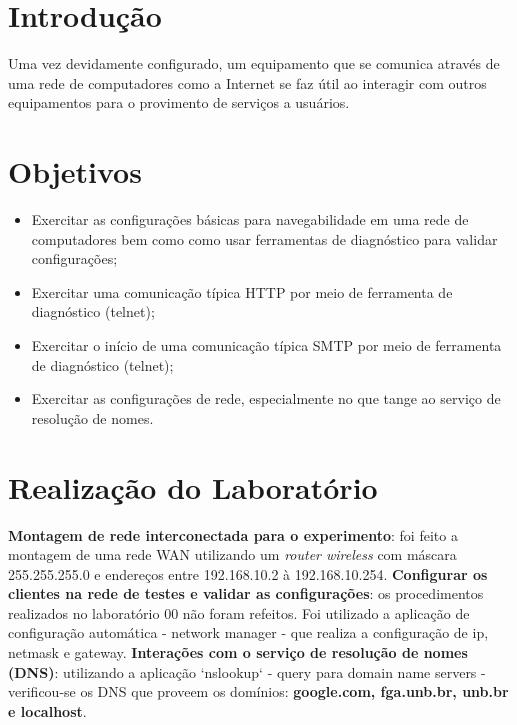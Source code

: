 \section{Introdução}

Uma vez devidamente configurado, um equipamento que se comunica através de uma rede de
computadores como a Internet se faz útil ao interagir com outros equipamentos para o provimento
de serviços a usuários.

\section{Objetivos}

\begin{itemize}
  \item Exercitar as configurações básicas para navegabilidade em uma rede de computadores bem como
    como usar ferramentas de diagnóstico para validar configurações;
  \item Exercitar uma comunicação típica HTTP por meio de ferramenta de diagnóstico (telnet);
  \item Exercitar o início de uma comunicação típica SMTP por meio de ferramenta de diagnóstico
    (telnet);
  \item Exercitar as configurações de rede, especialmente no que tange ao serviço de resolução de
    nomes.
\end{itemize}

\section{Realização do Laboratório}
\textbf{Montagem de rede interconectada para o experimento}: foi feito a montagem de uma rede WAN utilizando
um \textit{router wireless} com máscara 255.255.255.0 e endereços entre 192.168.10.2 à 192.168.10.254.
\bigbreak
\textbf{Configurar os clientes na rede de testes e validar as configurações}: os procedimentos realizados no
laboratório 00 não foram refeitos. Foi utilizado a aplicação de configuração automática - network manager -
que realiza a configuração de ip, netmask e gateway.
\bigbreak
\textbf{Interações com o serviço de resolução de nomes (DNS)}: utilizando a aplicação `nslookup` - query para
domain name servers - verificou-se os DNS que proveem os domínios: \textbf{google.com, fga.unb.br, unb.br e localhost}.
\bigbreak

